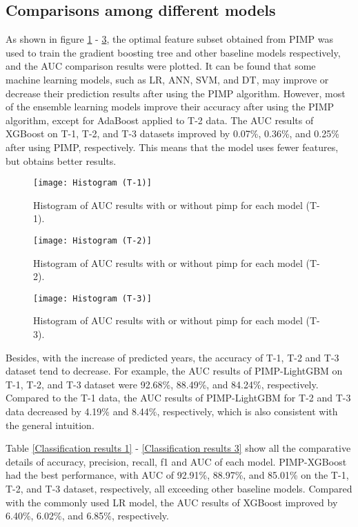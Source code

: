 \documentclass[review]{elsarticle}
\begin{document}
\subsection{Comparisons among different models}
As shown in figure \ref{fig: Histogram of AUC 1} - \ref{fig: Histogram of AUC 3}, the optimal feature subset obtained from PIMP was used to train the gradient boosting tree and other baseline models respectively, and the AUC comparison results were plotted. It can be found that some machine learning models, such as LR, ANN, SVM, and DT, may improve or decrease their prediction results after using the PIMP algorithm. However, most of the ensemble learning models improve their accuracy after using the PIMP algorithm, except for AdaBoost applied to T-2 data. The AUC results of XGBoost on T-1, T-2, and T-3 datasets improved by 0.07\%, 0.36\%, and 0.25\% after using PIMP, respectively. This means that the model uses fewer features, but obtains better results.

\begin{figure}[H]
    \centering
    \texttt{[image: Histogram (T-1)]}
    \caption{Histogram of AUC results with or without pimp for each model (T-1).}
    \label{fig: Histogram of AUC 1}
\end{figure}

\begin{figure}[H]
    \centering
    \texttt{[image: Histogram (T-2)]}
    \caption{Histogram of AUC results with or without pimp for each model (T-2).}
    \label{fig: Histogram of AUC 2}
\end{figure}

\begin{figure}[H]
    \centering
    \texttt{[image: Histogram (T-3)]}
    \caption{Histogram of AUC results with or without pimp for each model (T-3).}
    \label{fig: Histogram of AUC 3}
\end{figure}

Besides, with the increase of predicted years, the accuracy of T-1, T-2 and T-3 dataset tend to decrease. For example, the AUC results of PIMP-LightGBM on T-1, T-2, and T-3 dataset were 92.68\%, 88.49\%, and 84.24\%, respectively. Compared to the T-1 data, the AUC results of PIMP-LightGBM for T-2 and T-3 data decreased by 4.19\% and 8.44\%, respectively, which is also consistent with the general intuition.

Table \ref{Classification results 1} - \ref{Classification results 3} show all the comparative details of accuracy, precision, recall, f1 and AUC of each model. PIMP-XGBoost had the best performance, with AUC of 92.91\%, 88.97\%, and 85.01\% on the T-1, T-2, and T-3 dataset, respectively, all exceeding other baseline models. Compared with the commonly used LR model, the AUC results of XGBoost improved by 6.40\%, 6.02\%, and 6.85\%, respectively.
\end{document}
